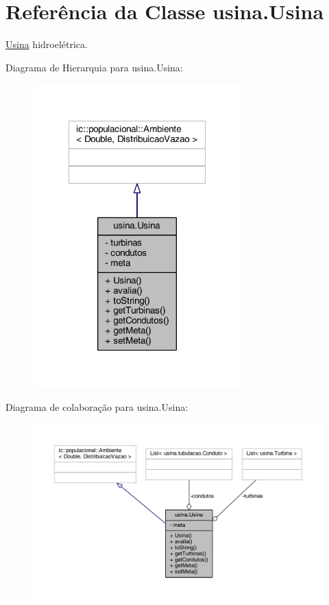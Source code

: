 \hypertarget{classusina_1_1_usina}{\section{Referência da Classe usina.\-Usina}
\label{classusina_1_1_usina}
}


\hyperlink{classusina_1_1_usina}{Usina} hidroelétrica.  




Diagrama de Hierarquia para usina.\-Usina\-:
\nopagebreak
\begin{figure}[H]
\begin{center}
\leavevmode
\includegraphics[width=228pt]{classusina_1_1_usina__inherit__graph}
\end{center}
\end{figure}


Diagrama de colaboração para usina.\-Usina\-:
\nopagebreak
\begin{figure}[H]
\begin{center}
\leavevmode
\includegraphics[width=350pt]{classusina_1_1_usina__coll__graph}
\end{center}
\end{figure}
